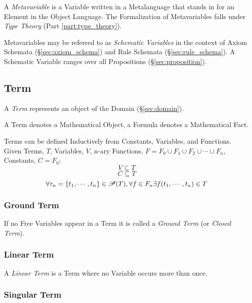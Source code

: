 A \emph{Metavariable} is a Variable written in a Metalanguage that
stands in for an Element in the Object Language. The Formalization of
Metavariables falls under \emph{Type Theory} (Part
\ref{part:type_theory}).

Metavariables may be referred to as \emph{Schematic Variables} in the
context of Axiom Schemata (\S\ref{sec:axiom_schema}) and Rule Schemata
(\S\ref{sec:rule_schema}). A Schematic Variable ranges over all
Propositions (\S\ref{sec:proposition}).



\subsection{Term}\label{sec:term}

A \emph{Term} represents an object of the Domain (\S\ref{sec:domain}).

A Term denotes a Mathematical Object, a Formula denotes a Mathematical
Fact.

Terms can be defined Inductively from Constants, Variables, and
Functions. Given Terms, $T$, Variables, $V$, n-ary Functions, $F = F_0
\cup F_1 \cup F_2 \cup \cdots \cup F_n$, Constants, $C = F_0$:
\[
  V \subseteq T
\]\[
  C \subseteq T
\]\[
  \forall \tau_n=\{t_1,\cdots,t_n\} \in \mathscr{P}(T), \forall f
  \in F_n \exists f(t_1,\cdots,t_n) \in T
\]



\subsubsection{Ground Term}\label{sec:ground_term}

If no Free Variables appear in a Term it is called a \emph{Ground
  Term} (or \emph{Closed Term}).



\subsubsection{Linear Term}\label{sec:linear_term}

A \emph{Linear Term} is a Term where no Variable occurs more than
once.



\subsubsection{Singular Term}\label{sec:singular_term}
\cite{chalmers02}

